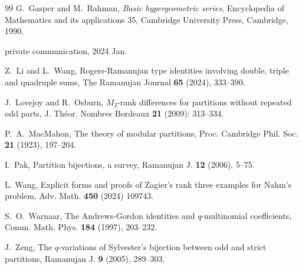\documentclass[11pt,reqno]{amsart}
\numberwithin{equation}{section}
\theoremstyle{plain}
\theoremstyle{definition}
\theoremstyle{named}
\begin{document}
\begin{thebibliography}{99}
 G.~Gasper and M.~Rahman, {\it Basic hypergeometric series}, Encyclopedia of Mathematics and its applications 35, Cambridge University Press, Cambridge, 1990.





 private communication, 2024 Jan.



 Z.~Li and L.~Wang, Rogers-Ramanujan type identities involving double, triple and quadruple sums, The Ramanujan Journal {\bf 65} (2024), 333--390.

 J.~Lovejoy and R.~Osburn, $M_2$-rank differences for partitions without repeated odd parts, J. Th\'eor. Nombres Bordeaux {\bf21} (2009): 313--334.

 P.~A.~MacMahon, The theory of modular partitions, Proc. Cambridge Phil. Soc. {\bf 21} (1923), 197--204.

 I.~Pak, Partition bijections, a survey, Ramanujan J. {\bf 12} (2006), 5--75.







 L. Wang, Explicit forms and proofs of Zagier's rank three examples for Nahm's problem, Adv. Math. {\bf 450} (2024) 109743.

 S.~O.~Warnaar, The Andrews-Gordon identities and $q$-multinomial coefficients, Comm. Math. Phys. {\bf 184} (1997), 203--232.

 J.~Zeng, The $q$-variations of Sylvester's bijection between odd and strict partitions, Ramanujan J. {\bf 9} (2005), 289--303.

\end{thebibliography}
\end{document}
